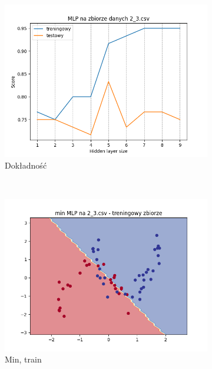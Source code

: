 \documentclass[12pt]{article}
\newcommand*{\subfigwidth}{0.24\textwidth}
\begin{document}
\begin{figure}[H]\centering
    \begin{subfigure}[t]{\subfigwidth}
        \includegraphics[width=\linewidth]{img/exp_3/mlp/2_3/accuracy.png}
        \caption{Dokładność}
    \end{subfigure}
    \\
    \begin{subfigure}[t]{\subfigwidth}
        \includegraphics[width=\linewidth]{img/exp_3/mlp/2_3/min/train_boundary.png}
        \caption{Min, train}
    \end{subfigure}
    \hfill
    \begin{subfigure}[t]{\subfigwidth}

\end{subfigure}
\end{figure}
\end{document}
